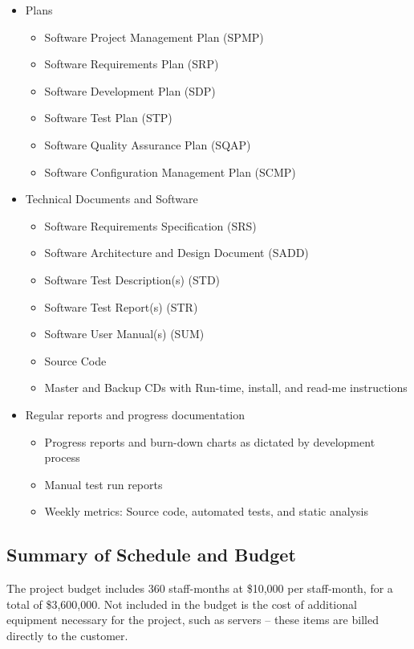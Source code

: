 \documentclass[11pt]{article}
\begin{document}
\begin{itemize}
\item Plans
  \begin{itemize}
  \item Software Project Management Plan (SPMP)
  \item Software Requirements Plan (SRP)
  \item Software Development Plan (SDP)
  \item Software Test Plan (STP)
  \item Software Quality Assurance Plan (SQAP)
  \item Software Configuration Management Plan (SCMP)
  \end{itemize}
\item Technical Documents and Software
  \begin{itemize}
  \item Software Requirements Specification (SRS)
  \item Software Architecture and Design Document (SADD)
  \item Software Test Description(s) (STD)
  \item Software Test Report(s) (STR)
  \item Software User Manual(s) (SUM)
  \item Source Code
  \item Master and Backup CDs with Run-time, install, and read-me instructions
  \end{itemize}
\item Regular reports and progress documentation
  \begin{itemize}
  \item Progress reports and burn-down charts as dictated by development process
  \item Manual test run reports
  \item Weekly metrics: Source code, automated tests, and static analysis
  \end{itemize}
\end{itemize}


\subsection{Summary of Schedule and Budget}
The project budget includes 360 staff-months at \$10,000 per staff-month, for a total of
\$3,600,000.  Not included in the budget is the cost of additional equipment necessary for the
project, such as servers -- these items are billed directly to the customer.
\end{document}
